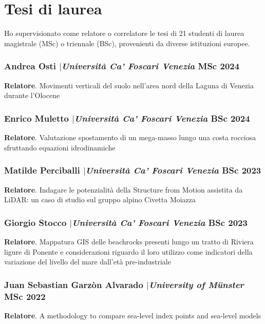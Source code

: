 \documentclass[11pt]{article}
\begin{document}
\section{Tesi di laurea}
{\normalfont Ho supervisionato come relatore o correlatore le tesi di 21 studenti di laurea magistrale (MSc) o triennale (BSc), provenienti da diverse istituzioni europee.}\\

\subsubsection{Andrea Osti $|${\normalfont\textit{Università Ca' Foscari Venezia}} \hfill MSc 2024}
{\footnotesize 
\textbf{Relatore}. Movimenti verticali del suolo nell’area nord della Laguna di Venezia durante l’Olocene}

\smallskip

\subsubsection{Enrico Muletto $|${\normalfont\textit{Università Ca' Foscari Venezia}} \hfill BSc 2024}
{\footnotesize 
\textbf{Relatore}. Valutazione spostamento di un mega-masso lungo una costa rocciosa sfruttando equazioni idrodinamiche}

\smallskip

\subsubsection{Matilde Perciballi $|${\normalfont\textit{Università Ca' Foscari Venezia}} \hfill BSc 2023}
{\footnotesize 
\textbf{Relatore}. Indagare le potenzialità della Structure from Motion assistita da LiDAR: un caso di studio sul gruppo alpino Civetta Moiazza}

\smallskip

\subsubsection{Giorgio Stocco $|${\normalfont\textit{Università Ca' Foscari Venezia}} \hfill BSc 2023}
{\footnotesize 
\textbf{Relatore}. Mappatura GIS delle beachrocks presenti lungo un tratto di Riviera ligure di Ponente e considerazioni riguardo il loro utilizzo come indicatori della variazione del livello del mare dall’età pre-industriale}

\smallskip

\subsubsection{Juan Sebastian Garzòn Alvarado $|${\normalfont\textit{University of Münster}} \hfill MSc 2022}
{\footnotesize 
\textbf{Relatore}. A methodology to compare sea-level index points and sea-level models}
\end{document}
